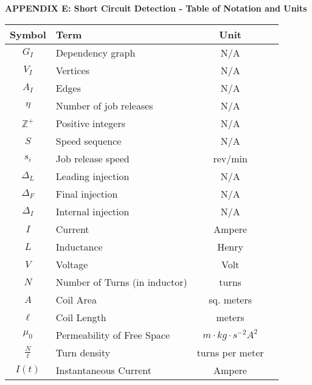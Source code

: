
\centerline{\large\bf APPENDIX E: Short Circuit Detection - Table of Notation and Units}
\label{appendix:scd-table-of-notation}
\begin{center}
\bgroup
\begin{tabular}{| c | l | c | c |}
    \hline
    Symbol & Term & Unit \\  \hline \hline \cline{1-3}
    $G_I$ & Dependency graph & N/A \\ \cline{1-3}
    $V_I$ & Vertices & N/A \\ \cline{1-3}
    $A_I$ & Edges & N/A \\ \cline{1-3}
    $\eta$ & Number of job releases & N/A \\ \cline{1-3}
    $\mathbb{Z}^+$ & Positive integers & N/A \\ \cline{1-3}
    $S$ & Speed sequence & N/A \\ \cline{1-3}
    $s_i$ & Job release speed & rev/min \\ \cline{1-3}
    $\Delta_L$ & Leading injection & N/A \\ \cline{1-3}
    $\Delta_F$ & Final injection & N/A \\ \cline{1-3}
    $\Delta_I$ & Internal injection & N/A \\ \cline{1-3}
    $I$ & Current & Ampere\\ \cline{1-3}
    $L$ & Inductance & Henry\\ \cline{1-3}
    $V$ & Voltage & Volt\\ \cline{1-3}
    $N$ & Number of Turns (in inductor) & turns\\ \cline{1-3}
    $A$ & Coil Area & sq. meters\\ \cline{1-3}
    $\ell$ & Coil Length & meters \\ \cline{1-3}
    $\mu_0$ & Permeability of Free Space & $m \cdot kg \cdot s^{-2} A^{2}$\\ \cline{1-3}
    $\frac{N}{\ell}$ & Turn density & turns per meter\\ \cline{1-3}
    $I(t)$ & Instantaneous Current & Ampere\\ \cline{1-3}
\end{tabular}
\egroup
\end{center}

